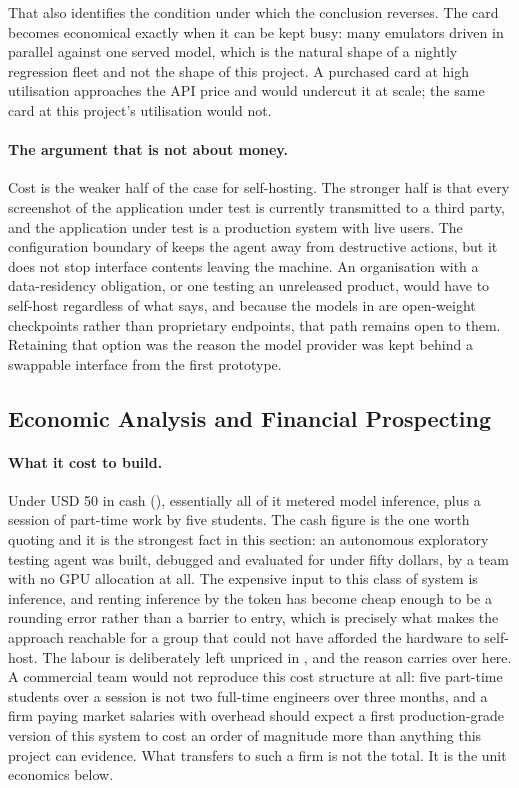 That also identifies the condition under which the conclusion reverses. The
card becomes economical exactly when it can be kept busy: many emulators driven in parallel against one served model, which is the natural shape of a
nightly regression fleet and not the shape of this project. A purchased card at
high utilisation approaches the API price and would undercut it at scale; the
same card at this project's utilisation would not.

\paragraph{The argument that is not about money.} Cost is the weaker half of
the case for self-hosting. The stronger half is that every screenshot of the
application under test is currently transmitted to a third party, and the
application under test is a production system with live users. The
configuration boundary of  keeps the agent away from
destructive actions, but it does not stop interface contents leaving the
machine. An organisation with a data-residency obligation, or one testing an
unreleased product, would have to self-host regardless of what
 says, and because the models in  are
open-weight checkpoints rather than proprietary endpoints, that path remains
open to them. Retaining that option was the reason the model provider was kept
behind a swappable interface from the first prototype.

\subsection{Economic Analysis and Financial Prospecting}
\label{sec:economics}

\paragraph{What it cost to build.} Under USD 50 in cash
(), essentially all of it metered model inference, plus a
session of part-time work by five students. The cash figure is the one worth
quoting and it is the strongest fact in this section: an autonomous exploratory
testing agent was built, debugged and evaluated for under fifty dollars, by a
team with no GPU allocation at all. The expensive input to this class of system
is inference, and renting inference by the token has become cheap enough to be
a rounding error rather than a barrier to entry, which is precisely what makes the approach reachable for a group that could not have afforded the
hardware to self-host. The labour is deliberately left unpriced in
, and the reason carries over here. A commercial team would
not reproduce this cost structure at all: five part-time students over a
session is not two full-time engineers over three months, and a firm paying
market salaries with overhead should expect a first production-grade version of
this system to cost an order of magnitude more than anything this project can
evidence. What transfers to such a firm is not the total. It is the unit
economics below.

